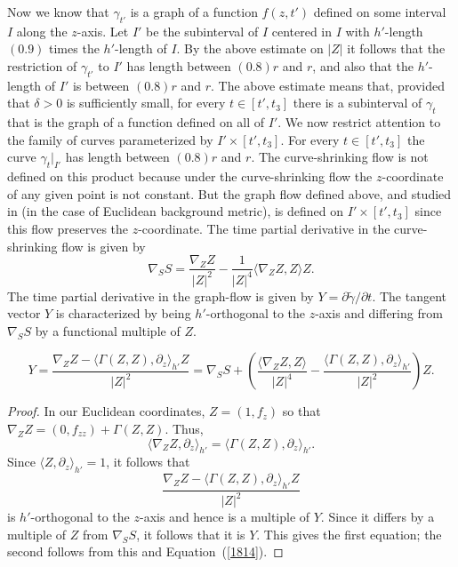 Now we know that $\gamma_{t'}$ is a graph of a function $f(z,t')$
defined on some  interval $I$ along the $z$-axis.  Let $I'$ be the
subinterval of $I$ centered in $I$ with $h'$-length $(0.9)$ times
the $h'$-length of $I$. By the above estimate on $|Z|$ it follows
that  the restriction of $\gamma_{t'}$ to $I'$ has length between
$(0.8)r$ and $r$, and also that the $h'$-length of $I'$ is between
$(0.8)r$ and $r$. The above estimate means that, provided that
$\delta>0$ is sufficiently small, for every $t\in [t',t_3]$ there is
a subinterval of $\gamma_t$ that is the graph of a function defined
on all of $I'$. We now restrict attention to the family of curves
parameterized by $I'\times [t',t_3]$. For every $t\in[t',t_3]$ the
curve $\gamma_t|_{I'}$ has length between $(0.8)r$ and $r$. The
curve-shrinking flow is not defined on this product because under
the curve-shrinking flow the $z$-coordinate of any given point is
not constant. But the graph flow defined above, and studied in
\cite{AG} (in the case of Euclidean background metric), is defined
on $I'\times [t',t_3]$ since this flow preserves the $z$-coordinate.
The time partial derivative in the curve-shrinking flow is given by
\begin{equation}\label{1814}
\nabla_SS=\frac{\nabla_ZZ}{|Z|^2}-\frac{1}{|Z|^4}\langle \nabla_ZZ,Z\rangle Z.
\end{equation} The time partial derivative in the graph-flow is given by
$Y=\partial\widetilde \gamma/\partial t$. The tangent vector $Y$ is
characterized by being $h'$-orthogonal to the $z$-axis and differing from
$\nabla_SS$ by a functional multiple of $Z$.

\begin{claim}
\label{claim:graph-flow-velocity-comparison}
\label{curvflowcompare}
$$Y=\frac{\nabla_ZZ-\langle\Gamma(Z,Z),\partial_z\rangle_{h'} Z}{|Z|^2}
=\nabla_SS+\left(\frac{\langle \nabla_ZZ,Z\rangle}{|Z|^4}
-\frac{\langle\Gamma(Z,Z),\partial_z\rangle_{h'} }{|Z|^2}\right)Z.$$
\end{claim}

\begin{proof}
In our Euclidean coordinates, $Z=(1,f_z)$ so that
$\nabla_ZZ=(0,f_{zz})+\Gamma(Z,Z)$. Thus,
$$\langle \nabla_ZZ,\partial_z\rangle_{h'}=\langle
\Gamma(Z,Z),\partial_z\rangle_{h'}.$$ Since $\langle
Z,\partial_z\rangle_{h'}=1$, it follows that
$$\frac{ \nabla_ZZ-\langle\Gamma(Z,Z),\partial_z\rangle_{h'} Z}{|Z|^2}$$ is
$h'$-orthogonal to the $z$-axis and hence is a multiple of $Y$. Since it
differs by a multiple of $Z$ from $\nabla_SS$, it follows that it is $Y$. This
gives the first equation; the second follows from this and
Equation~(\ref{1814}).
\end{proof}


